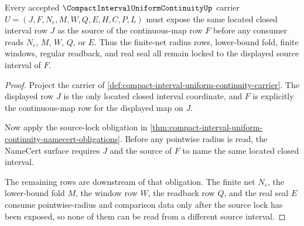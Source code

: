\begin{theorem}
\label{thm:compact-interval-uniform-continuity-source-lock}
Every accepted $\CompactIntervalUniformContinuityUp$ carrier
$U=(J,F,N_\varepsilon,M,W,Q,E,H,C,P,L)$ must expose the same located closed
interval row $J$ as the source of the continuous-map row $F$ before any
consumer reads $N_\varepsilon$, $M$, $W$, $Q$, or $E$. Thus the finite-net
radius rows, lower-bound fold, finite windows, regular readback, and real seal
all remain locked to the displayed source interval of $F$.
\end{theorem}
\begin{proof}
Project the carrier of
\autoref{def:compact-interval-uniform-continuity-carrier}. The displayed row
$J$ is the only located closed interval coordinate, and $F$ is explicitly the
continuous-map row for the displayed map on $J$.

Now apply the source-lock obligation in
\autoref{thm:compact-interval-uniform-continuity-namecert-obligations}. Before
any pointwise radius is read, the NameCert surface requires $J$ and the source
of $F$ to name the same located closed interval.

The remaining rows are downstream of that obligation. The finite net
$N_\varepsilon$, the lower-bound fold $M$, the window row $W$, the readback row
$Q$, and the real seal $E$ consume pointwise-radius and comparison data only
after the source lock has been exposed, so none of them can be read from a
different source interval.
\end{proof}

